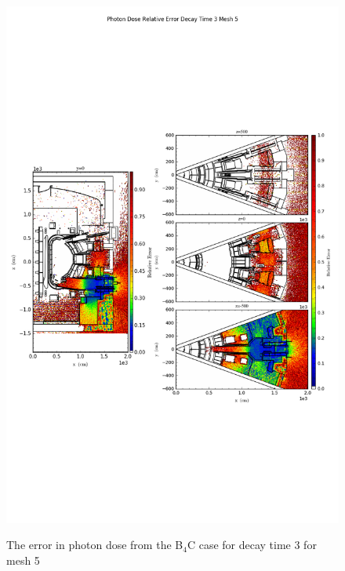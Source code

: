 \begin{figure}[ht!]
\centering
\includegraphics[trim={0cm 9cm 0cm 10cm},clip,scale=0.75]{../plots/final_model_nob4c/Photon_Dose_Relative_Error_Decay_Time_3_Mesh_5.png}
\label{fig:photons_dc3_no4bc_m5_error}
\caption{The error in photon dose from the B$_4$C case for decay time 3 for mesh 5}
\end{figure}
